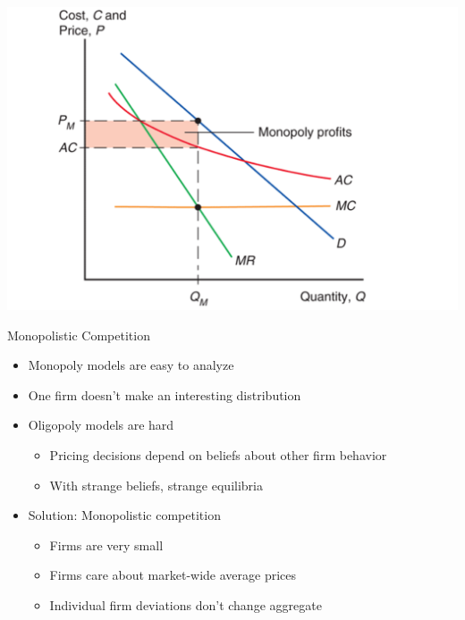 \documentclass[ignorenonframetext,]{beamer}
\begin{document}
\begin{frame}

    \includegraphics[scale=0.25]{monopreview.png}

\end{frame}

\begin{frame}{Monopolistic Competition}

    \begin{itemize}
        \item Monopoly models are easy to analyze
        \item One firm doesn't make an interesting distribution
        \item Oligopoly models are hard
        \begin{itemize}
            \item Pricing decisions depend on beliefs about other firm behavior
            \item With strange beliefs, strange equilibria 
        \end{itemize}
        \item Solution: Monopolistic competition
        \begin{itemize}
            \item Firms are very small
            \item Firms care about market-wide average prices
            \item Individual firm deviations don't change aggregate
        \end{itemize}
    \end{itemize}
            
\end{frame}
\end{document}

